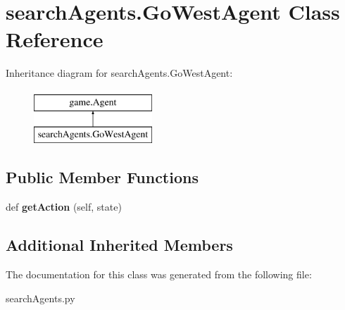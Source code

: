 \hypertarget{classsearch_agents_1_1_go_west_agent}{}\section{search\+Agents.\+Go\+West\+Agent Class Reference}
\label{classsearch_agents_1_1_go_west_agent}
Inheritance diagram for search\+Agents.\+Go\+West\+Agent\+:\begin{figure}[H]
\begin{center}
\leavevmode
\includegraphics[height=2.000000cm]{classsearch_agents_1_1_go_west_agent}
\end{center}
\end{figure}
\subsection*{Public Member Functions}
\begin{DoxyCompactItemize}
\item 
\mbox{\label{classsearch_agents_1_1_go_west_agent_a9388dd683a456db8643cbe65f37341cc}} 
def {\bfseries get\+Action} (self, state)
\end{DoxyCompactItemize}
\subsection*{Additional Inherited Members}


The documentation for this class was generated from the following file\+:\begin{DoxyCompactItemize}
\item 
search\+Agents.\+py\end{DoxyCompactItemize}
